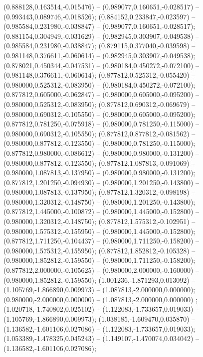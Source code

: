  (0.888128,0.163514,-0.015476) -- (0.989077,0.160651,-0.028517) -- (0.993443,0.089746,-0.018526);
 (0.884152,0.233847,-0.023597) -- (0.985584,0.231980,-0.038847) -- (0.989077,0.160651,-0.028517);
 (0.881154,0.304949,-0.031629) -- (0.982945,0.303907,-0.049538) -- (0.985584,0.231980,-0.038847);
 (0.879115,0.377040,-0.039598) -- (0.981148,0.376611,-0.060614) -- (0.982945,0.303907,-0.049538);
 (0.878021,0.450344,-0.047531) -- (0.980184,0.450272,-0.072100) -- (0.981148,0.376611,-0.060614);
 (0.877812,0.525312,-0.055420) -- (0.980000,0.525312,-0.083950) -- (0.980184,0.450272,-0.072100);
 (0.877812,0.605000,-0.062847) -- (0.980000,0.605000,-0.095200) -- (0.980000,0.525312,-0.083950);
 (0.877812,0.690312,-0.069679) -- (0.980000,0.690312,-0.105550) -- (0.980000,0.605000,-0.095200);
 (0.877812,0.781250,-0.075918) -- (0.980000,0.781250,-0.115000) -- (0.980000,0.690312,-0.105550);
 (0.877812,0.877812,-0.081562) -- (0.980000,0.877812,-0.123550) -- (0.980000,0.781250,-0.115000);
 (0.877812,0.980000,-0.086612) -- (0.980000,0.980000,-0.131200) -- (0.980000,0.877812,-0.123550);
 (0.877812,1.087813,-0.091069) -- (0.980000,1.087813,-0.137950) -- (0.980000,0.980000,-0.131200);
 (0.877812,1.201250,-0.094930) -- (0.980000,1.201250,-0.143800) -- (0.980000,1.087813,-0.137950);
 (0.877812,1.320312,-0.098198) -- (0.980000,1.320312,-0.148750) -- (0.980000,1.201250,-0.143800);
 (0.877812,1.445000,-0.100872) -- (0.980000,1.445000,-0.152800) -- (0.980000,1.320312,-0.148750);
 (0.877812,1.575312,-0.102951) -- (0.980000,1.575312,-0.155950) -- (0.980000,1.445000,-0.152800);
 (0.877812,1.711250,-0.104437) -- (0.980000,1.711250,-0.158200) -- (0.980000,1.575312,-0.155950);
 (0.877812,1.852812,-0.105328) -- (0.980000,1.852812,-0.159550) -- (0.980000,1.711250,-0.158200);
 (0.877812,2.000000,-0.105625) -- (0.980000,2.000000,-0.160000) -- (0.980000,1.852812,-0.159550);
 (1.001236,-1.871293,0.013092) -- (1.105769,-1.866890,0.009973) -- (1.087813,-2.000000,0.000000);
 (0.980000,-2.000000,0.000000) -- (1.087813,-2.000000,0.000000) ;
 (1.020718,-1.740802,0.025102) -- (1.122083,-1.733657,0.019033) -- (1.105769,-1.866890,0.009973);
 (1.038185,-1.609470,0.035870) -- (1.136582,-1.601106,0.027086) -- (1.122083,-1.733657,0.019033);
 (1.053389,-1.478325,0.045243) -- (1.149107,-1.470074,0.034042) -- (1.136582,-1.601106,0.027086);
